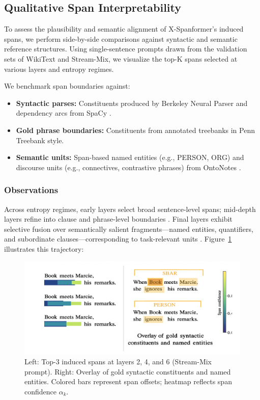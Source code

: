 \subsection{Qualitative Span Interpretability}
\label{sec:qualitative-spans}

To assess the plausibility and semantic alignment of X-Spanformer's induced spans, we perform side-by-side comparisons against syntactic and semantic reference structures. Using single-sentence prompts drawn from the validation sets of WikiText and Stream-Mix, we visualize the top-K spans selected at various layers and entropy regimes.

We benchmark span boundaries against:

\begin{itemize}[leftmargin=1.5em]
  \item \textbf{Syntactic parses:} Constituents produced by Berkeley Neural Parser \cite{kitaev2018constituency} and dependency arcs from SpaCy \cite{honnibal2017spacy}.
  \item \textbf{Gold phrase boundaries:} Constituents from annotated treebanks in Penn Treebank style.
  \item \textbf{Semantic units:} Span-based named entities (e.g., PERSON, ORG) and discourse units (e.g., connectives, contrastive phrases) from OntoNotes \cite{weischedel2013ontonotes}.
\end{itemize}

\subsubsection*{Observations}

Across entropy regimes, early layers select broad sentence-level spans; mid-depth layers refine into clause and phrase-level boundaries \cite{kitaev2018constituency}. Final layers exhibit selective fusion over semantically salient fragments—named entities, quantifiers, and subordinate clauses—corresponding to task-relevant units \cite{weischedel2013ontonotes, honnibal2017spacy}. Figure~\ref{fig:span_alignment_viz} illustrates this trajectory:

\begin{figure}[H]
  \centering
  \includegraphics[width=\textwidth]{figures/figure_8.png}
  \caption{Left: Top-3 induced spans at layers 2, 4, and 6 (Stream-Mix prompt). Right: Overlay of gold syntactic constituents and named entities. Colored bars represent span offsets; heatmap reflects span confidence \(\alpha_k\).}
  \label{fig:span_alignment_viz}
\end{figure}

